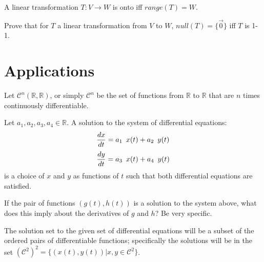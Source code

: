 \begin{theorem} A linear transformation $T:V \rightarrow W$ is onto iff $range(T)=W$. \end{theorem}

\bq Prove that for $T$ a linear transformation from $V$ to $W$, \break $null(T)=\{ \vec{0} \}$ iff $T$ is 1-1.
\eq

\section{Applications}
\begin{annotation}
\end{annotation}

\begin{definition}
Let $\mathcal{C}^n(\mathbb{R},\mathbb{R})$, or simply $\mathcal{C}^n$ be the set of functions from $\mathbb{R}$ to $\mathbb{R}$ that are $n$ times continuously differentiable.
\end{definition}
\bq Let $a_1,a_2,a_3,a_4 \in \mathbb{R}$. A solution to the system of differential equations: $$\dfrac{dx}{dt} = a_1 \enskip x(t)+a_2 \enskip y(t)$$ $$\dfrac{dy}{dt} = a_3 \enskip x(t) +a_4 \enskip y(t) $$ is a choice of $x$ and $y$ as functions of $t$ such that both differential equations are satisfied.
\be
\item If the pair of functions $(g(t),h(t))$ is a solution to the system above, what does this imply about the derivatives of $g$ and $h$? Be very specific.

The solution set to the given set of differential equations will be a subset of the ordered pairs of differentiable functions; specifically the solutions will be in the set $(\mathcal{C}^2)^2=\{ (x(t),y(t))|x,y \in \mathcal{C}^2\}$.

